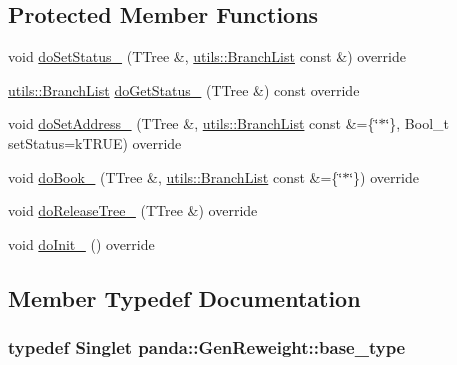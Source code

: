 \subsection*{Protected Member Functions}
\begin{DoxyCompactItemize}
\item 
void \hyperlink{classpanda_1_1GenReweight_ac8e96798e059c6ddcbec6e0f91ab8190}{doSetStatus\_\-} (TTree \&, \hyperlink{classpanda_1_1utils_1_1BranchList}{utils::BranchList} const \&) override
\item 
\hyperlink{classpanda_1_1utils_1_1BranchList}{utils::BranchList} \hyperlink{classpanda_1_1GenReweight_a0d5945a3b2fd8aba14d8259a3dc36e97}{doGetStatus\_\-} (TTree \&) const override
\item 
void \hyperlink{classpanda_1_1GenReweight_a9710ec6dfdb67b5e7d1f4ae811154b16}{doSetAddress\_\-} (TTree \&, \hyperlink{classpanda_1_1utils_1_1BranchList}{utils::BranchList} const \&=\{\char`\"{}$\ast$\char`\"{}\}, Bool\_\-t setStatus=kTRUE) override
\item 
void \hyperlink{classpanda_1_1GenReweight_aab268ef7f69fc6069828c22cc5eae282}{doBook\_\-} (TTree \&, \hyperlink{classpanda_1_1utils_1_1BranchList}{utils::BranchList} const \&=\{\char`\"{}$\ast$\char`\"{}\}) override
\item 
void \hyperlink{classpanda_1_1GenReweight_ae503dff0c490313c523e8357e5916ed6}{doReleaseTree\_\-} (TTree \&) override
\item 
void \hyperlink{classpanda_1_1GenReweight_a0b244ad39f5b2143524a3375f4a7c726}{doInit\_\-} () override
\end{DoxyCompactItemize}


\subsection{Member Typedef Documentation}
\hypertarget{classpanda_1_1GenReweight_ada54555efb9e53c8d27891ab5ead6ef5}{
\subsubsection[{base\_\-type}]{\setlength{\rightskip}{0pt plus 5cm}typedef {\bf Singlet} {\bf panda::GenReweight::base\_\-type}}}
\label{classpanda_1_1GenReweight_ada54555efb9e53c8d27891ab5ead6ef5}


